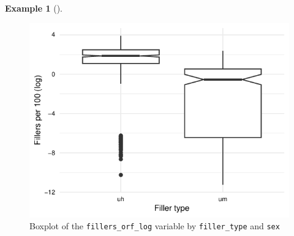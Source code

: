 \documentclass[
  letterpaper,
]{book}
\theoremstyle{definition}
\newtheorem{example}{Example}[chapter]
\theoremstyle{remark}
\begin{document}
\begin{example}[]
\begin{figure}[!htb]
\begin{minipage}{0.50\linewidth}
{\includegraphics{part_4/10_infer_files/figure-pdf/fig-infer-multi-sex-plot-1.pdf}

}


\end{minipage}%
%
\begin{minipage}{0.50\linewidth}



\end{minipage}%

\caption{\label{fig-infer-multi-sex-plot}Boxplot of the
\texttt{fillers\_orf\_log} variable by \texttt{filler\_type} and
\texttt{sex}}

\end{figure}%

\end{example}
\end{document}
